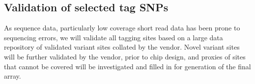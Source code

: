 \subsection{Validation of selected tag SNPs}

As sequence data, particularly low coverage short read data has been prone to sequencing errors, we will validate all tagging sites based on a large data repository of validated variant sites collated by the vendor. Novel variant sites will be further validated by the vendor, prior to chip design, and proxies of sites that cannot be covered will be investigated and filled in for generation of the final array.